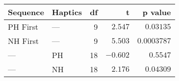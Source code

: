 \begin{tabular}{llrrr}
\toprule
 Sequence & Haptics &  df &        t &     p value \\
\midrule
 PH First &     --- &   9 &  $2.547$ &   $0.03135$ \\
 NH First &     --- &   9 &  $5.503$ & $0.0003787$ \\
      --- &      PH &  18 & $-0.602$ &    $0.5547$ \\
      --- &      NH &  18 &  $2.176$ &   $0.04309$ \\
\bottomrule
\end{tabular}
